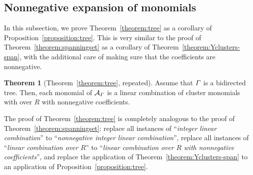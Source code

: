 \documentclass[11pt]{article}
\theoremstyle{definition}
\newtheorem*{theo*}{Theorem}
\numberwithin{equation}{section}
\newcommand{\coefficientring}{R}
\newcommand{\graphLPalgebra}[1]{\mathcal{A}_{#1}}
\begin{document}
\subsection{Nonnegative expansion of monomials}

In this subsection,
we prove Theorem~\ref{theorem:tree} as a corollary of Proposition~\ref{proposition:tree}.
This is very similar to the proof of Theorem~\ref{theorem:spanningset} as a corollary of Theorem~\ref{theorem:Yclusters-span},
with the additional care of making sure that the coefficients are nonnegative.

\begin{theo*}[Theorem~\ref{theorem:tree}, repeated]
    Assume that \(\varGamma\) is a bidirected tree.
    Then, each monomial of \(\graphLPalgebra{\graph}\) is a linear combination of cluster monomials with over \(\coefficientring\) with nonnegative coefficients.
\end{theo*}

The proof of Theorem~\ref{theorem:tree} is completely analogous to the proof of Theorem~\ref{theorem:spanningset}:
replace all instances of ``\emph{integer linear combination}'' to ``\emph{nonnegative integer linear combination}'',
replace all instances of ``\emph{linear combination over \(\coefficientring\)}'' to ``\emph{linear combination over \(\coefficientring\) with nonnegative coefficients}'',
and replace the application of Theorem~\ref{theorem:Yclusters-span}
to an application of Proposition~\ref{proposition:tree}.
\end{document}
